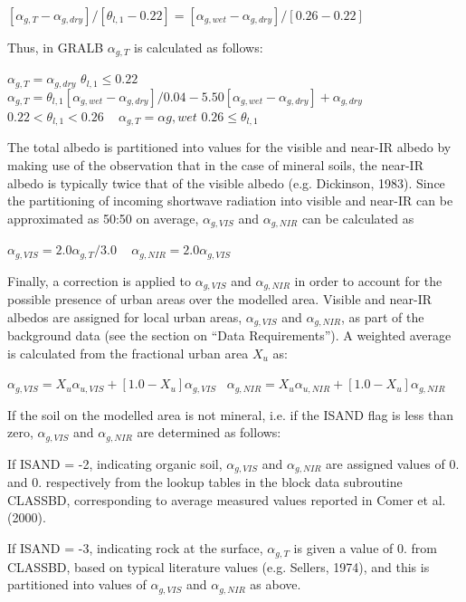 $[\alpha_{g,T} - \alpha_{g,dry} ] / [\theta_{l,1} - 0.22] = [\alpha_{g,wet} - \alpha_{g,dry} ]/[0.26 - 0.22]$

Thus, in G\+R\+A\+L\+B $\alpha_{g,T}$ is calculated as follows\+:

$\alpha_{g,T} = \alpha_{g,dry}$ $\theta_{l,1} \leq 0.22 $ ~\newline
 $\alpha_{g,T} = \theta_{l,1} [\alpha_{g,wet} - \alpha_{g,dry} ]/0.04 - 5.50 [\alpha_{g,wet} - \alpha_{g,dry} ] + \alpha_{g,dry} $ $0.22 < \theta_{l,1} < 0.26 $ ~\newline
 $\alpha_{g,T} = \alpha{g,wet} $ $ 0.26 \leq \theta_{l,1}$

The total albedo is partitioned into values for the visible and near-\/\+I\+R albedo by making use of the observation that in the case of mineral soils, the near-\/\+I\+R albedo is typically twice that of the visible albedo (e.\+g. Dickinson, 1983). Since the partitioning of incoming shortwave radiation into visible and near-\/\+I\+R can be approximated as 50\+:50 on average, $\alpha_{g,VIS}$ and $\alpha_{g,NIR}$ can be calculated as

$\alpha_{g,VIS} = 2.0 \alpha_{g,T} /3.0$ ~\newline
 $\alpha_{g,NIR} = 2.0 \alpha_{g,VIS}$

Finally, a correction is applied to $\alpha_{g,VIS}$ and $\alpha_{g,NIR}$ in order to account for the possible presence of urban areas over the modelled area. Visible and near-\/\+I\+R albedos are assigned for local urban areas, $\alpha_{g,VIS}$ and $\alpha_{g,NIR}$, as part of the background data (see the section on “\+Data Requirements”). A weighted average is calculated from the fractional urban area $X_u$ as\+:

$\alpha_{g,VIS} = X_u \alpha_{u,VIS} + [1.0-X_u ] \alpha_{g,VIS}$~\newline
 $\alpha_{g,NIR} = X_u \alpha_{u,NIR} + [1.0-X_u ] \alpha_{g,NIR}$

If the soil on the modelled area is not mineral, i.\+e. if the I\+S\+A\+N\+D flag is less than zero, $\alpha_{g,VIS}$ and $\alpha_{g,NIR}$ are determined as follows\+:

If I\+S\+A\+N\+D = -\/2, indicating organic soil, $\alpha_{g,VIS}$ and $\alpha_{g,NIR}$ are assigned values of 0. and 0. respectively from the lookup tables in the block data subroutine C\+L\+A\+S\+S\+B\+D, corresponding to average measured values reported in Comer et al. (2000).

If I\+S\+A\+N\+D = -\/3, indicating rock at the surface, $\alpha_{g,T}$ is given a value of 0. from C\+L\+A\+S\+S\+B\+D, based on typical literature values (e.\+g. Sellers, 1974), and this is partitioned into values of $\alpha_{g,VIS}$ and $\alpha_{g,NIR}$ as above.

